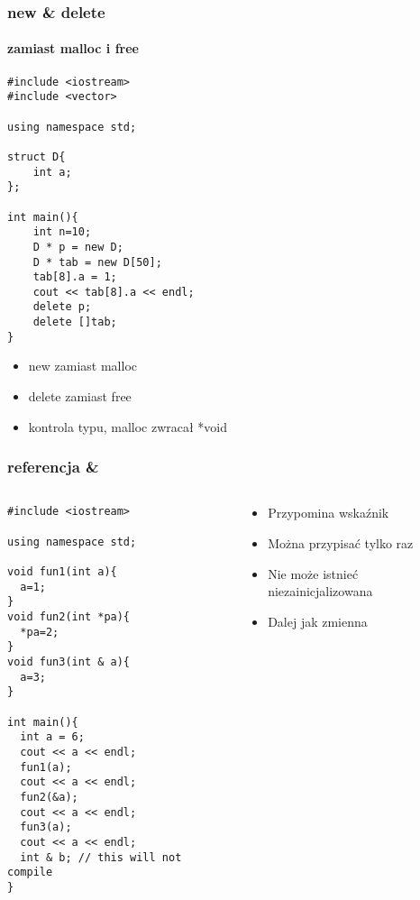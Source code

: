\documentclass[10pt]{beamer}
\begin{document}
\begin{frame}[fragile]
  \frametitle{new \& delete}
  \framesubtitle{zamiast malloc i free}
\begin{lstlisting}
#include <iostream>
#include <vector>

using namespace std;

struct D{
    int a;
};

int main(){
    int n=10;
    D * p = new D;
    D * tab = new D[50];
    tab[8].a = 1;
    cout << tab[8].a << endl;
    delete p;
    delete []tab;
}
\end{lstlisting}

\begin{itemize}
  \item new zamiast malloc
  \item delete zamiast free
  \item kontrola typu, malloc zwracał *void
\end{itemize}

\end{frame}

\begin{frame}[fragile]
  \frametitle{referencja \&}
  \begin{columns}
    \begin{column}{0.48\textwidth}
      \begin{lstlisting}
#include <iostream>

using namespace std;

void fun1(int a){
  a=1;
}
void fun2(int *pa){
  *pa=2;
}
void fun3(int & a){
  a=3;
}

int main(){
  int a = 6;
  cout << a << endl;
  fun1(a);
  cout << a << endl;
  fun2(&a);
  cout << a << endl;
  fun3(a);
  cout << a << endl;
  int & b; // this will not compile
}
\end{lstlisting}
    \end{column}
    \begin{column}{0.48\textwidth}
      \begin{itemize}
        \item Przypomina wskaźnik
        \item Można przypisać tylko raz
        \item Nie może istnieć niezainicjalizowana
        \item Dalej jak zmienna
      \end{itemize}
    \end{column}
  \end{columns}
\end{frame}
\end{document}
